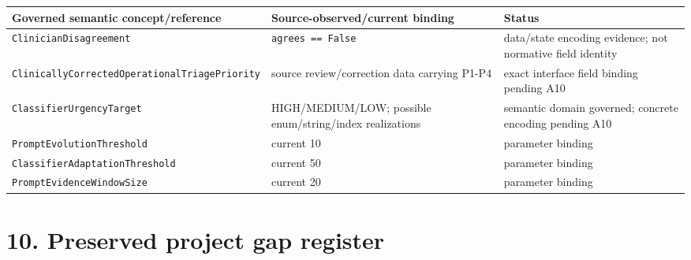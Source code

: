 \documentclass[11pt,a4paper]{article}
\begin{document}
\begin{longtable}[]{@{}lll@{}}
\toprule\noalign{}
Governed semantic concept/reference & Source-observed/current binding &
Status \\
\midrule\noalign{}
\endhead
\bottomrule\noalign{}
\endlastfoot
\texttt{ClinicianDisagreement} & \texttt{agrees\ ==\ False} & data/state
encoding evidence; not normative field identity \\
\texttt{ClinicallyCorrectedOperationalTriagePriority} & source
review/correction data carrying P1-P4 & exact interface field binding
pending A10 \\
\texttt{ClassifierUrgencyTarget} & HIGH/MEDIUM/LOW; possible
enum/string/index realizations & semantic domain governed; concrete
encoding pending A10 \\
\texttt{PromptEvolutionThreshold} & current 10 & parameter binding \\
\texttt{ClassifierAdaptationThreshold} & current 50 & parameter
binding \\
\texttt{PromptEvidenceWindowSize} & current 20 & parameter binding \\
\end{longtable}

\section{10. Preserved project gap
register}\label{10-preserved-project-gap-register}
\end{document}

